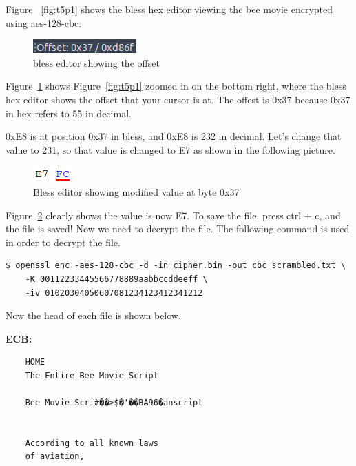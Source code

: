 \documentclass[12pt]{article}
\begin{document}
Figure ~\ref{fig:t5p1} shows the bless hex editor viewing the bee movie encrypted using aes-128-cbc.

\begin{figure}[H]
    \begin{center}
        \includegraphics[scale=1]{t5p1.1.png}
    \end{center}{}
    \caption{bless editor showing the offset}
    \label{fig:t5p1.1}
\end{figure}

Figure~\ref{fig:t5p1.1} shows Figure~\ref{fig:t5p1} zoomed in on the bottom right, where the bless hex editor shows the offset that your cursor is at. The offest is 0x37 because 0x37 in hex refers to 55 in decimal. 

0xE8 is at position 0x37 in bless, and 0xE8 is 232 in decimal. Let's change that value to 231, so that value is changed to E7 as shown in the following picture.

\begin{figure}[H]
    \begin{center}
        \includegraphics[scale=1]{t5p3.png}
    \end{center}{}
    \caption{Bless editor showing modified value at byte 0x37}
    \label{fig:t5p3}
\end{figure}

Figure~\ref{fig:t5p3} clearly shows the value is now E7. To save the file, press ctrl + c, and the file is saved! Now we need to decrypt the file. The following command is used in order to decrypt the file.

\begin{verbatim}
$ openssl enc -aes-128-cbc -d -in cipher.bin -out cbc_scrambled.txt \
    -K 00112233445566778889aabbccddeeff \
    -iv 01020304050607081234123412341212
\end{verbatim}


Now the head of each file is shown below.


\textbf{ECB:}
\begin{verbatim}
    HOME
    The Entire Bee Movie Script
    
    Bee Movie Scri#��>$�'��BA96�anscript
    
    
    According to all known laws
    of aviation,
\end{verbatim}
\end{document}

